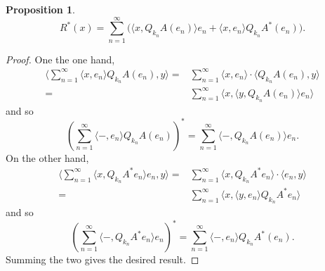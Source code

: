 \documentclass{dcthesis}
\numberwithin{equation}{section}
\numberwithin{equation}{section}
\theoremstyle{definition}
\newtheorem{proposition}[equation]{Proposition}
\begin{document}
\begin{proposition}
\label{prop_r_adjoint}
	\begin{equation*}
		R^\ast(x) = \sum_{n=1}^\infty \big( \langle x, Q_{k_n}A(e_n) \rangle e_n + \langle x, e_n \rangle Q_{k_n}A^\ast (e_n) \Big).
	\end{equation*}
\end{proposition}
\begin{proof}
	One the one hand, 
	\begin{align*}
		\langle \sum_{n=1}^\infty \langle x, e_n \rangle Q_{k_n}A(e_n), y \rangle
		=& \sum_{n=1}^\infty \langle x, e_n \rangle \cdot \langle Q_{k_n}A(e_n), y \rangle \\
		=& \sum_{n=1}^\infty \langle x, \langle y, Q_{k_n}A(e_n) \rangle e_n \rangle
	\end{align*}
	and so 
	\begin{equation*}
		\left( \sum_{n=1}^\infty \langle -, e_n \rangle Q_{k_n}A(e_n) \right)^\ast = \sum_{n=1}^\infty \langle -, Q_{k_n}A(e_n) \rangle e_n.
	\end{equation*}
	On the other hand,
	\begin{align*}
		\langle \sum_{n=1}^\infty \langle x, Q_{k_n}A^\ast e_n \rangle e_n, y \rangle
		=& \sum_{n=1}^\infty \langle x, Q_{k_n}A^\ast e_n \rangle \cdot \langle e_n, y \rangle \\
		=& \sum_{n=1}^\infty \langle x, \langle y, e_n \rangle Q_{k_n}A^\ast e_n \rangle
	\end{align*}
	and so 
	\begin{equation*}
		\left(\sum_{n=1}^\infty \langle -, Q_{k_n}A^\ast e_n\rangle e_n \right)^\ast = \sum_{n=1}^\infty \langle -, e_n \rangle Q_{k_n}A^\ast (e_n).
	\end{equation*}
	Summing the two gives the desired result.
\end{proof}
\end{document}
